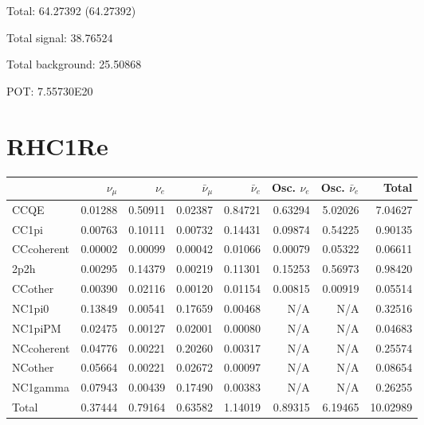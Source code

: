 \documentclass[10pt,a4paper]{article}
\begin{document}
Total: 64.27392    (64.27392)


Total signal: 38.76524


Total background: 25.50868

POT: 7.55730E20


\section*{RHC1Re}
\begin{tabular} { | l ||r | r | r | r | r | r | | r | }
\hline
              & $\nu_\mu$            & $\nu_e$              & $\bar{\nu}_{\mu}$    & $\bar{\nu}_{e}$      & Osc. $\nu_e$         & Osc. $\bar{\nu}_{e}$ & Total                \\ \hline\hline
 CCQE         & 0.01288              & 0.50911              & 0.02387              & 0.84721              & 0.63294              & 5.02026              & 7.04627              \\ \hline
 CC1pi        & 0.00763              & 0.10111              & 0.00732              & 0.14431              & 0.09874              & 0.54225              & 0.90135              \\ \hline
 CCcoherent   & 0.00002              & 0.00099              & 0.00042              & 0.01066              & 0.00079              & 0.05322              & 0.06611              \\ \hline
 2p2h         & 0.00295              & 0.14379              & 0.00219              & 0.11301              & 0.15253              & 0.56973              & 0.98420              \\ \hline
 CCother      & 0.00390              & 0.02116              & 0.00120              & 0.01154              & 0.00815              & 0.00919              & 0.05514              \\ \hline
 NC1pi0       & 0.13849              & 0.00541              & 0.17659              & 0.00468              & N/A                  & N/A                  & 0.32516              \\ \hline
 NC1piPM      & 0.02475              & 0.00127              & 0.02001              & 0.00080              & N/A                  & N/A                  & 0.04683              \\ \hline
 NCcoherent   & 0.04776              & 0.00221              & 0.20260              & 0.00317              & N/A                  & N/A                  & 0.25574              \\ \hline
 NCother      & 0.05664              & 0.00221              & 0.02672              & 0.00097              & N/A                  & N/A                  & 0.08654              \\ \hline
 NC1gamma     & 0.07943              & 0.00439              & 0.17490              & 0.00383              & N/A                  & N/A                  & 0.26255              \\ \hline
\hline
 Total        & 0.37444              & 0.79164              & 0.63582              & 1.14019              & 0.89315              & 6.19465              & 10.02989             \\ \hline

\end{tabular}
\end{document}
